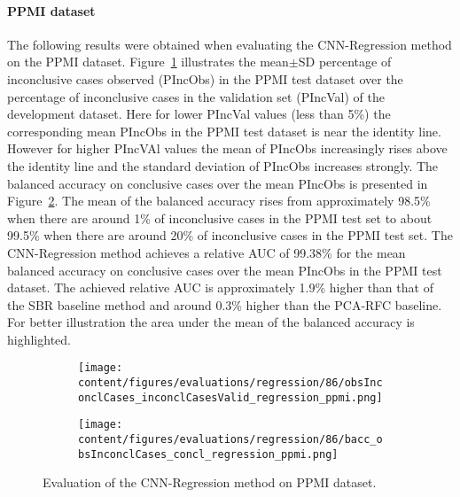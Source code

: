 
\paragraph{PPMI dataset}

The following results were obtained when evaluating the CNN-Regression method on the PPMI dataset.
Figure~\ref{fig:obsInconclCases_inconclCasesValid_regression_ppmi} illustrates the
mean$\pm$SD percentage of inconclusive cases observed (PIncObs) in the PPMI test dataset 
over the percentage of inconclusive cases in the validation set (PIncVal) of the development dataset.
Here for lower PIncVal values (less than 5\%) the corresponding mean PIncObs 
in the PPMI test dataset is near the identity line.
However for higher PIncVAl values the mean of PIncObs increasingly rises above the identity line
and the standard deviation of PIncObs increases strongly.
The balanced accuracy on conclusive cases over the mean PIncObs is presented in Figure~\ref{fig:bacc_obsInconclCases_concl_regression_ppmi}.
The mean of the balanced accuracy rises from approximately 98.5\% 
when there are around 1\% of inconclusive cases in the PPMI test set to about 99.5\% 
when there are around 20\% of inconclusive cases in the PPMI test set.
The CNN-Regression method achieves a relative AUC of 99.38\% for the mean balanced accuracy on conclusive cases 
over the mean PIncObs in the PPMI test dataset.
The achieved relative AUC is approximately 1.9\% higher than that of the SBR baseline method 
and around 0.3\% higher than the PCA-RFC baseline.
For better illustration the area under the mean of the balanced accuracy is highlighted.


\begin{figure}[ht]
  \begin{subfigure}{0.9\textwidth}
    \centering
    \texttt{[image: content/figures/evaluations/regression/86/obsInconclCases\_inconclCasesValid\_regression\_ppmi.png]}
    \label{fig:obsInconclCases_inconclCasesValid_regression_ppmi}
  \end{subfigure}
  \hfill
  \begin{subfigure}{0.9\textwidth}
    \centering
    \texttt{[image: content/figures/evaluations/regression/86/bacc\_obsInconclCases\_concl\_regression\_ppmi.png]}
    \label{fig:bacc_obsInconclCases_concl_regression_ppmi}
  \end{subfigure}
  \caption{Evaluation of the CNN-Regression method on PPMI dataset.}
  \label{fig:perf_regression_ppmi}
\end{figure}




